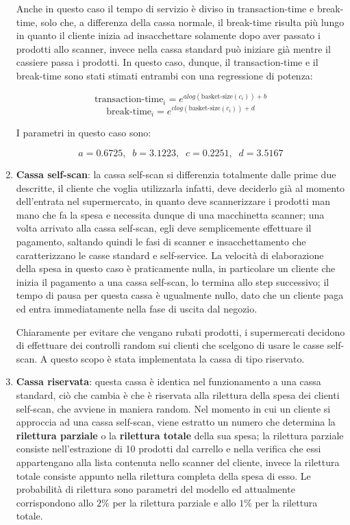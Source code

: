 \begin{enumerate}
Anche in questo caso il tempo di servizio è diviso in transaction-time e break-time, solo che, a differenza della cassa normale, il break-time risulta più lungo in quanto il cliente inizia ad insacchettare solamente dopo aver passato i prodotti allo scanner, invece nella cassa standard può iniziare già mentre il cassiere passa i prodotti. In questo caso, dunque, il transaction-time e il break-time sono stati stimati entrambi con una regressione di potenza:

\begin{equation}\label{eq:transaction-time-self-service}
\text{transaction-time}_i = e^{a log(\text{basket-size}(c_i)) + b}
\end{equation}
\begin{equation}\label{eq:break-time-self-service}
\text{break-time}_i = e^{c log(\text{basket-size}(c_i)) + d}
\end{equation}

I parametri in questo caso sono:

\begin{equation}
a = 0.6725, \;\; b = 3.1223, \;\; c = 0.2251, \;\; d = 3.5167
\end{equation}

\item \textbf{Cassa self-scan}: la cassa self-scan si differenzia totalmente dalle prime due descritte, il cliente che voglia utilizzarla infatti, deve deciderlo già al momento dell'entrata nel supermercato, in quanto deve scannerizzare i prodotti man mano che fa la spesa e necessita dunque di una macchinetta scanner; una volta arrivato alla cassa self-scan, egli deve semplicemente effettuare il pagamento, saltando quindi le fasi di scanner e insacchettamento che caratterizzano le casse standard e self-service. La velocità di elaborazione della spesa in questo caso è praticamente nulla, in particolare un cliente che inizia il pagamento a una cassa self-scan, lo termina allo step successivo; il tempo di pausa per questa cassa è ugualmente nullo, dato che un cliente paga ed entra immediatamente nella fase di uscita dal negozio.

Chiaramente per evitare che vengano rubati prodotti, i supermercati decidono di effettuare dei controlli random sui clienti che scelgono di usare le casse self-scan. A questo scopo è stata implementata la cassa di tipo riservato.
\item \textbf{Cassa riservata}: questa cassa è identica nel
  funzionamento a una cassa standard, ciò che cambia è che è riservata
  alla rilettura della spesa dei clienti self-scan, che avviene in
  maniera random. Nel momento in cui un cliente si approccia ad una
  cassa self-scan, viene estratto un numero che determina la
  \textbf{rilettura parziale} o la \textbf{rilettura totale} della sua
  spesa; la rilettura parziale consiste nell'estrazione di 10 prodotti
  dal carrello e nella verifica che essi appartengano alla lista
  contenuta nello scanner del cliente, invece la rilettura totale
  consiste appunto nella rilettura completa della spesa di esso. Le
  probabilità di rilettura sono parametri del modello ed attualmente
  corrispondono allo $2 \%$ per la rilettura parziale e allo $1 \%$
  per la rilettura totale.


\end{enumerate}
